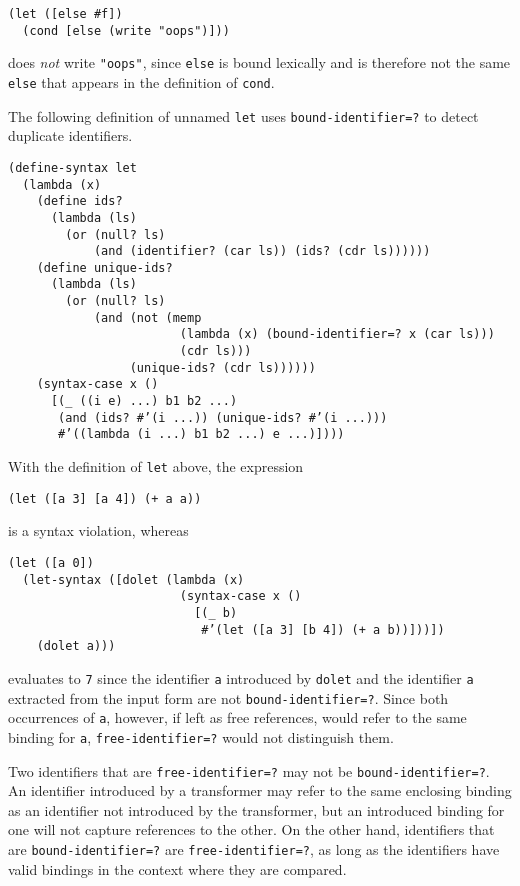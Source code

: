 \begin{alltt}
(let ([else \#{}f])
  (cond [else (write "oops")]))
\end{alltt}


does \textit{not} write \texttt{"oops"}, since \texttt{else} is bound
lexically and is
therefore not the same \texttt{else} that appears in the definition of
\texttt{cond}.


The following definition of unnamed \texttt{let}
uses \texttt{bound-identifier=?} to detect duplicate identifiers.


\begin{alltt}
(define-syntax let
  (lambda (x)
    (define ids?
      (lambda (ls)
        (or (null? ls)
            (and (identifier? (car ls)) (ids? (cdr ls))))))
    (define unique-ids?
      (lambda (ls)
        (or (null? ls)
            (and (not (memp
                        (lambda (x) (bound-identifier=? x (car ls)))
                        (cdr ls)))
                 (unique-ids? (cdr ls))))))
    (syntax-case x ()
      [(\_{} ((i e) ...) b1 b2 ...)
       (and (ids? \#{}'(i ...)) (unique-ids? \#{}'(i ...)))
       \#{}'((lambda (i ...) b1 b2 ...) e ...)])))
\end{alltt}


With the definition of \texttt{let} above, the expression


\texttt{(let ([a 3] [a 4]) (+ a a))}

is a syntax violation, whereas


\begin{alltt}
(let ([a 0])
  (let-syntax ([dolet (lambda (x)
                        (syntax-case x ()
                          [(\_{} b)
                           \#{}'(let ([a 3] [b 4]) (+ a b))]))])
    (dolet a)))
\end{alltt}


evaluates to \texttt{7} since the identifier \texttt{a} introduced by \texttt{dolet}
and the identifier \texttt{a} extracted from the input form are not
\texttt{bound-identifier=?}.
Since both occurrences of \texttt{a}, however, if left as free references,
would refer to the same binding for \texttt{a}, \texttt{free-identifier=?}
would not distinguish them.


Two identifiers that are \texttt{free-identifier=?} may not be
\texttt{bound-identifier=?}.
An identifier introduced by a transformer may refer to the same
enclosing binding as an identifier not introduced by the transformer,
but an introduced binding for one will not capture references to the other.
On the other hand, identifiers that are \texttt{bound-identifier=?} are
\texttt{free-identifier=?}, as long as the identifiers have valid
bindings in the context where they are compared.


